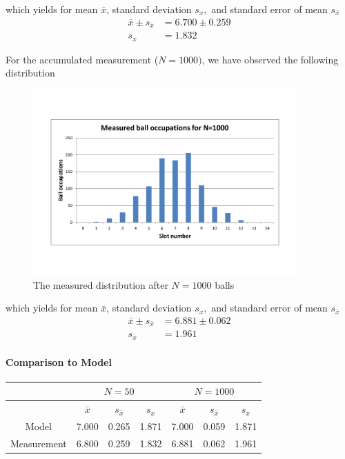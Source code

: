 \documentclass{scrreprt}
\begin{document}
which yields for mean $\bar{x}$, standard deviation $s_x,$ and standard error of mean $s_{\bar{x}}$
\begin{align*}
\bar{x} \pm s_{\bar{x}} &= 6.700 \pm 0.259\\
s_x &= 1.832
\end{align*}

For the accumulated measurement ($N=1000)$, we have observed the following distribution

\begin{figure}[H]
    \center   
        \includegraphics[width=0.9\textwidth]{img/ball_occup_n_1000}
        \caption{The measured distribution after $N=1000$ balls}
\end{figure}

which yields for mean $\bar{x}$, standard deviation $s_x,$ and standard error of mean $s_{\bar{x}}$
\begin{align*}
\bar{x} \pm s_{\bar{x}} &= 6.881 \pm 0.062\\
s_x &= 1.961
\end{align*}

\paragraph*{Comparison to Model}

\begin{center}
    \begin{tabular}{|c|ccc|ccc|}
    \hline
    & \multicolumn{3}{c|}{$N=50$} & \multicolumn{3}{|c|}{$N=1000$}\\
    \hline
    & $\bar{x}$ & $s_{\bar{x}}$ & $s_x$ & $\bar{x}$ & $s_{\bar{x}}$ & $s_x$ \\
    \hline
    Model & 7.000 & 0.265 & 1.871 & 7.000 & 0.059 & 1.871\\
    \hline
    Measurement & 6.800 & 0.259 & 1.832 & 6.881 & 0.062 & 1.961\\
    \hline
    \end{tabular}
\end{center}
\end{document}
